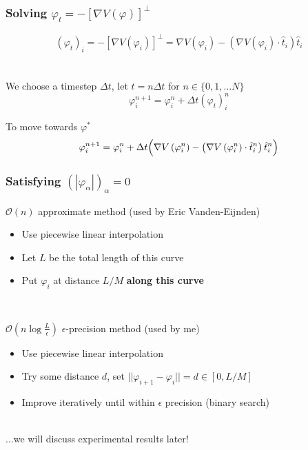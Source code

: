 \documentclass{beamer}
\renewcommand{\phi}{\varphi}
\renewcommand{\(}{\left(}
\renewcommand{\)}{\right)}
\newcommand{\dt}{\Delta t}
\begin{document}
\begin{frame}
\frametitle{Solving $\phi_t=-[\nabla V(\phi)]^\bot$}
$$(\phi_t)_i=-[\nabla V(\phi_i)]^\bot = \nabla V(\phi_i) - (\nabla V(\phi_i) \cdot \hat t_i)\hat t_i$$\\~\\
We choose a timestep $\dt$, let $t=n\dt$ for $n\in\{0, 1, \dots N\}$\\
$$\phi_i^{n+1} = \phi_i^n+\dt(\phi_t)_i^n$$
\begin{block}{To move towards $\phi^*$}
$$\phi_i^{n+1} = \phi_i^n+\dt\Big{(}\nabla V\(\phi_i^n\) - \(\nabla V\(\phi_i^n\) \cdot \hat t_i^n\)\hat t_i^n\Big{)}$$
\end{block}
\end{frame}

\begin{frame}
\frametitle{Satisfying $(|\phi_\alpha|)_\alpha=0$}
\begin{block}{$\mathcal{O}(n)$ approximate method (used by Eric Vanden-Eijnden)}
\begin{itemize}
\item Use piecewise linear interpolation
\item Let $L$ be the total length of this curve
\item Put $\phi_i$ at distance $L/M$ \textbf{along this curve}
\end{itemize}
\end{block}
~\\
\begin{block}{$\mathcal{O}(n\log \frac{L}{\epsilon})$ $\epsilon$-precision method (used by me)}
\begin{itemize}
\item Use piecewise linear interpolation
\item Try some distance $d$, set $||\phi_{i+1}-\phi_i|| = d \in [0, L/M]$
\item Improve iteratively until within $\epsilon$ precision (binary search)
\end{itemize}
\end{block}
~\\
...we will discuss experimental results later!
\end{frame}

\end{document}
